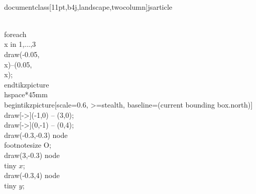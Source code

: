 \\documentclass[11pt,b4j,landscape,twocolumn]{jsarticle}
\begin{document}
\\foreach \\x in {1,...,3}{\\draw(-0.05,\\x)--(0.05,\\x);}
\\end{tikzpicture}
%
\\hspace*{45mm}
%
\\begin{tikzpicture}[scale=0.6, >=stealth, baseline=(current bounding box.north)]
\\draw[->](-1,0) -- (3,0);
\\draw[->](0,-1) -- (0,4);
\\draw(-0.3,-0.3) node {\\footnotesize O};
\\draw(3,-0.3) node {\\tiny $x$};
\\draw(-0.3,4) node {\\tiny $y$};
\end{document}
